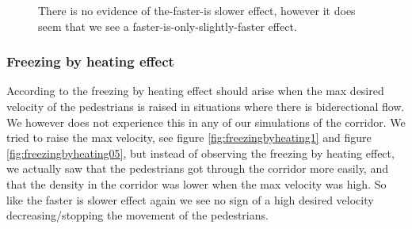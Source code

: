 \begin{figure}[h]
\caption{There is no evidence of the-faster-is slower effect, however it does seem that we see a faster-is-only-slightly-faster effect.}
\label{fig:isfasterslower}
\end{figure}


\subsubsection{Freezing by heating effect}
According to \cite{self-org} the freezing by heating effect should
arise when the max desired velocity of the pedestrians is raised in situations where there is biderectional flow.
We however does not experience this in any of our simulations of the corridor.
We tried to raise the max velocity, see figure \ref{fig:freezingbyheating1} and figure
\ref{fig:freezingbyheating05}, but instead of observing the freezing
by heating effect, we actually saw that the pedestrians got through the corridor
more easily, and that the density in the corridor was lower when the
max velocity was high. So like the faster is slower effect again we see no sign of a high desired velocity decreasing/stopping
 the movement of the pedestrians.


